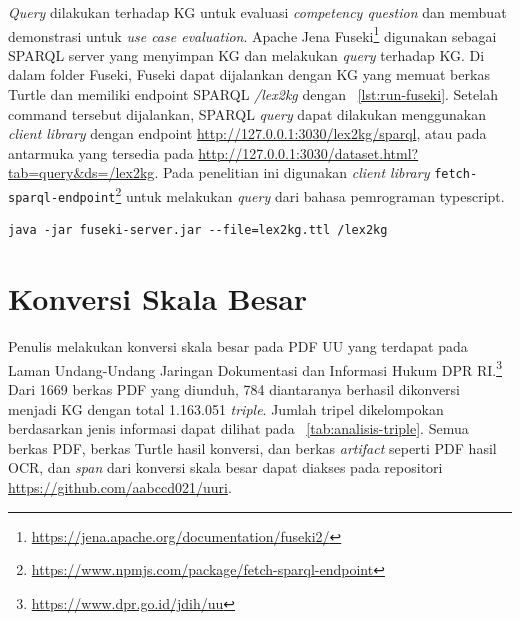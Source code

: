 \textit{Query} dilakukan terhadap KG untuk evaluasi \textit{competency question} dan membuat
demonstrasi untuk \textit{use case evaluation}. Apache Jena
Fuseki\footnote{\url{https://jena.apache.org/documentation/fuseki2/}} digunakan sebagai SPARQL
server yang menyimpan KG dan melakukan \textit{query} terhadap KG. Di dalam folder Fuseki, Fuseki
dapat dijalankan dengan KG yang memuat berkas Turtle  dan memiliki endpoint SPARQL
\textit{/lex2kg} dengan \lst~\ref{lst:run-fuseki}. Setelah command tersebut dijalankan, SPARQL
\textit{query} dapat dilakukan menggunakan \textit{client library} dengan endpoint
\url{http://127.0.0.1:3030/lex2kg/sparql}, atau pada antarmuka yang tersedia pada
\url{http://127.0.0.1:3030/dataset.html?tab=query&ds=/lex2kg}. Pada penelitian ini digunakan
\textit{client library}
\texttt{fetch-sparql-endpoint}\footnote{\url{https://www.npmjs.com/package/fetch-sparql-endpoint}}
untuk melakukan \textit{query} dari bahasa pemrograman typescript.


\begin{listing}[H]
  \begin{verbatim}
java -jar fuseki-server.jar --file=lex2kg.ttl /lex2kg
  \end{verbatim}
  \caption{Command untuk menjalankan Fuseki}
  \label{lst:run-fuseki}
\end{listing}

\section{Konversi Skala Besar}
\label{sec:konversi-skala-besar}

Penulis melakukan konversi skala besar pada PDF UU yang terdapat pada Laman Undang-Undang Jaringan
Dokumentasi dan Informasi Hukum DPR RI.\footnote{\url{https://www.dpr.go.id/jdih/uu}} Dari 1669
berkas PDF yang diunduh, 784 diantaranya berhasil dikonversi menjadi KG dengan total 1.163.051
\textit{triple}. Jumlah tripel dikelompokan berdasarkan jenis informasi dapat dilihat pada
\tab~\ref{tab:analisis-triple}. Semua berkas PDF, berkas Turtle hasil konversi, dan berkas
\textit{artifact} seperti PDF hasil OCR, dan \textit{span} dari konversi skala besar dapat diakses
pada repositori \url{https://github.com/aabccd021/uuri}.

